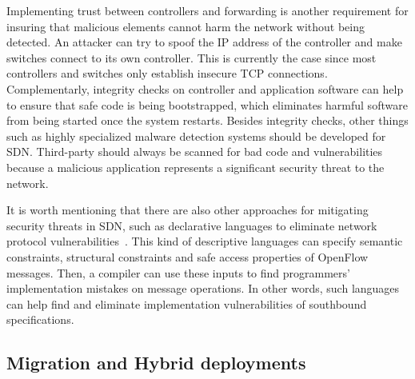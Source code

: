 Implementing trust between controllers and forwarding is another requirement for insuring that malicious elements 
cannot harm the network without being detected. 
An attacker can try to spoof the IP address of the controller and make switches connect to its own controller. 
This is currently the case since most controllers and switches only establish insecure TCP connections. 
Complementarly, integrity checks on controller and application software can help to ensure that safe code is being bootstrapped, which eliminates harmful software from being started once the system restarts. 
Besides integrity checks, other things such as highly specialized malware detection systems should be developed for SDN. 
Third-party \manapps should always be scanned for bad code and vulnerabilities because a malicious application represents a significant security threat to the network. 

It is worth mentioning that there are also other approaches for mitigating security threats in SDN, such as declarative languages to eliminate network 
protocol vulnerabilities~\cite{casey2013}. 
This kind of descriptive languages can specify semantic constraints, structural constraints and safe access properties of OpenFlow messages. 
Then, a compiler can use these inputs to find programmers' implementation mistakes on message operations. 
In other words, such languages can help find and eliminate implementation vulnerabilities of southbound specifications.


\subsection{Migration and Hybrid deployments}
\label{sec:hybrid}

